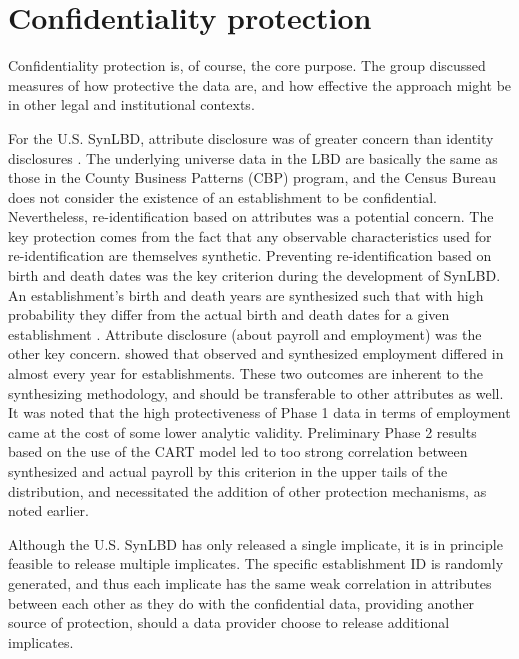 \documentclass[letterpaper,12pt]{article}
\begin{document}


\section{Confidentiality protection}
Confidentiality protection is, of course, the core purpose. The group discussed measures of how protective the data are, and how effective the approach might be in other legal and institutional contexts.

For the  U.S. SynLBD, attribute disclosure was of greater concern than identity disclosures \citep{KinneyEtAl2011}. The underlying universe data in the LBD are basically the same as those in the County Business Patterns (CBP) program, and the Census Bureau does not consider the existence of an establishment to be confidential. Nevertheless, re-identification based on attributes was a potential concern. The key protection comes from the fact that any observable characteristics used for re-identification are themselves synthetic. 
Preventing re-identification based on birth and death dates was the key criterion during the development of SynLBD. An establishment's birth and death years are synthesized such that with high probability they differ from the  actual birth and death dates for a given establishment \citep[Table 2]{KinneyEtAl2011}. Attribute disclosure (about payroll and employment) was the other key concern. \cite[Figure 13]{KinneyEtAl2011} showed that observed and synthesized employment differed in almost every year for establishments. These two outcomes are inherent to the synthesizing methodology, and should be transferable to other attributes as well. It was noted that the high protectiveness of Phase 1 data in terms of employment came at the cost of some lower analytic validity. Preliminary Phase 2 results based on the use of the CART model \citep{RePEc:cen:wpaper:14-12} led to too strong correlation between synthesized and actual payroll by this criterion in the upper tails of the distribution, and necessitated the addition of other protection mechanisms, as noted earlier. 

Although the U.S. SynLBD has only released a single implicate, it is in principle feasible to release multiple implicates. The specific establishment ID is randomly generated, and thus each implicate has the same weak correlation in attributes between each other as they do with the confidential data, providing another source of protection, should a data provider choose to release additional implicates.
\end{document}
